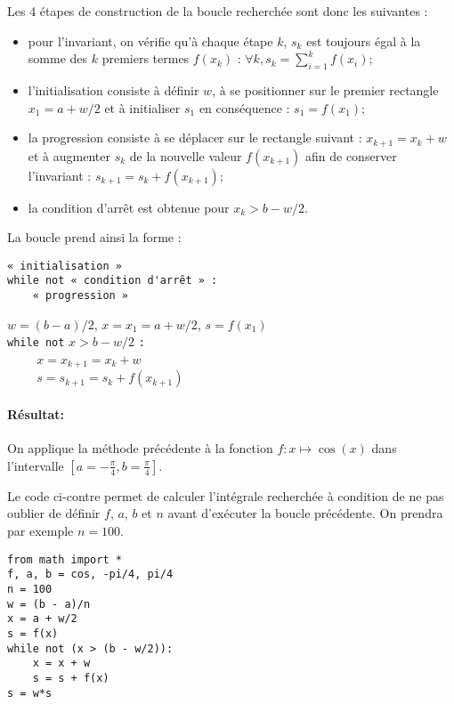 \documentclass[11pt,a4paper]{article}
\begin{document}
Les 4 étapes de construction de la boucle recherchée sont donc les suivantes :
\begin{itemize}
\item pour l'invariant, on vérifie qu'à chaque étape $k$, $s_k$ est toujours égal à la somme 
	des $k$ premiers termes $f(x_k)$ : 
	$\displaystyle \forall k, s_k = \sum_{i=1}^k f(x_i)$;
\item l'initialisation consiste à définir $w$, à se positionner sur le premier rectangle 
	$x_1 = a + w/2$ et à initialiser $s_1$ en conséquence : $s_1 = f(x_1)$;
\item la progression consiste à se déplacer sur le rectangle suivant : $x_{k+1} = x_{k} + w$
	et à augmenter $s_k$ de la nouvelle valeur $f(x_{k+1})$ afin de conserver l'invariant :
	$s_{k+1} = s_k + f(x_{k+1})$;
\item la condition d'arrêt est obtenue pour $x_k > b - w/2$.
\end{itemize}
\vspace*{3mm}

\noindent La boucle prend ainsi la forme :\\
\begin{minipage}[t]{8cm}
\begin{Verbatim}
« initialisation »
while not « condition d'arrêt » :
    « progression »
\end{Verbatim}
\end{minipage}
\hfill
\begin{minipage}[t]{7cm}\footnotesize
$w = (b-a)/2$, $x = x_1 = a + w/2$, $s = f(x_1)$\\
\texttt{while not} $x > b-w/2$ \texttt{:}\\
\mbox{}\texttt{\ \ \ \ } $x = x_{k+1} = x_{k} + w$\\
\mbox{}\texttt{\ \ \ \ } $s = s_{k+1} = s_k + f(x_{k+1})$\\
\end{minipage}

\paragraph{Résultat:} On applique la méthode précédente à la fonction $f : x \mapsto \cos(x)$
dans l'intervalle $\displaystyle \left[a=-\frac{\pi}{4},b=\frac{\pi}{4}\right]$.

\noindent\begin{minipage}{7cm}
Le code \python{} ci-contre permet de calculer l'intégrale recherchée
à condition de ne pas oublier de définir $f$, $a$, $b$ et $n$
avant d'exécuter la boucle précédente. On prendra par exemple $n = 100$.
\end{minipage}
\hfill
\begin{minipage}{8cm}\footnotesize
\begin{lstlisting}[caption=\textbf{intégration numérique}]
from math import *
f, a, b = cos, -pi/4, pi/4
n = 100
w = (b - a)/n
x = a + w/2
s = f(x)
while not (x > (b - w/2)):
    x = x + w
    s = s + f(x)
s = w*s
\end{lstlisting}
\end{minipage}
\end{document}
